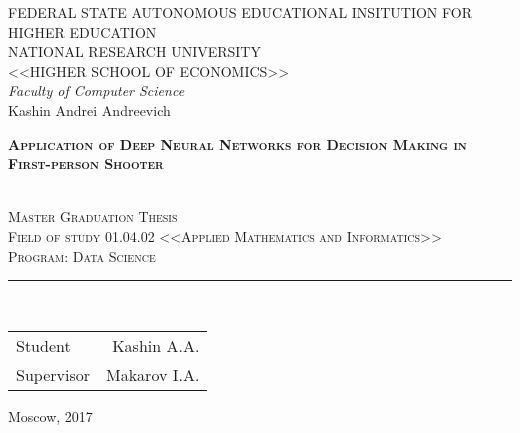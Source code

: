 
\thispagestyle{empty}

\begin{center}

  \textsc{FEDERAL STATE AUTONOMOUS EDUCATIONAL INSITUTION FOR HIGHER EDUCATION}\\[0.2cm]

  \textsc{NATIONAL RESEARCH UNIVERSITY \\ <<HIGHER SCHOOL OF ECONOMICS>>}\\[0.7cm]

  \textit{Faculty of Computer Science}\\[0.5cm]

  Kashin Andrei Andreevich \\ [0.5cm]

  \begin{Large}
    \textsc{\textbf{Application of Deep Neural Networks for Decision Making in First-person Shooter}}
  \end{Large}\\[1cm]

  \textsc{Master Graduation Thesis \\
  Field of study 01.04.02 <<Applied Mathematics and Informatics>> \\
  Program: Data Science}\\[0.7cm] 

  \rule{\textwidth}{0.5pt}\\[1.5cm]

\end{center}

\begin{center}
  \begin{tabular}{lr}
    Student &
    Kashin A.A.
    \\[0.7cm]
    Supervisor &
    Makarov I.A.
  \end{tabular}

  \vspace{1.5cm}

  \vfill
  Moscow, 2017

\end{center}

